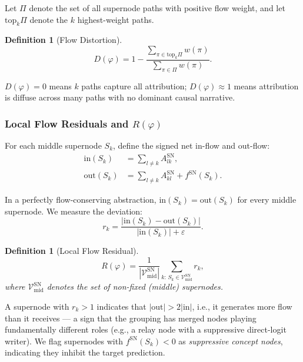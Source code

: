 \documentclass[11pt]{article}
\newtheorem{definition}[theorem]{Definition}
\newcommand{\cV}{\mathcal{V}}
\newcommand{\1}{\mathbbm{1}}
\newcommand{\eps}{\varepsilon}
\begin{document}
Let $\Pi$ denote the set of all supernode paths with positive flow weight, and let $\mathrm{top}_k \Pi$ denote the $k$ highest-weight paths.

\begin{definition}[Flow Distortion]
  \begin{equation}
    D(\varphi) = 1 - \frac{\sum_{\pi \in \mathrm{top}_k \Pi} w(\pi)}{\sum_{\pi \in \Pi} w(\pi)}.
    \label{eq:D-phi}
  \end{equation}
\end{definition}

$D(\varphi) = 0$ means $k$ paths capture all attribution; $D(\varphi) \approx 1$ means attribution is diffuse across many paths with no dominant causal narrative.

\subsubsection{Local Flow Residuals and $R(\varphi)$}
\label{sec:residuals}

For each middle supernode $S_k$, define the signed net in-flow and out-flow:
\begin{align}
  \mathrm{in}(S_k) &= \sum_{l \ne k} A^{\mathrm{SN}}_{lk}, \label{eq:inflow} \\
  \mathrm{out}(S_k) &= \sum_{l \ne k} A^{\mathrm{SN}}_{kl} + f^{\mathrm{SN}}(S_k). \label{eq:outflow}
\end{align}

In a perfectly flow-conserving abstraction, $\mathrm{in}(S_k) = \mathrm{out}(S_k)$ for every middle supernode.
We measure the deviation:
\[
  r_k = \frac{|\mathrm{in}(S_k) - \mathrm{out}(S_k)|}{|\mathrm{in}(S_k)| + \eps}.
\]

\begin{definition}[Local Flow Residual]
  \begin{equation}
    R(\varphi) = \frac{1}{|\cV_{\mathrm{mid}}^{\mathrm{SN}}|} \sum_{k:\, S_k \in \cV_{\mathrm{mid}}^{\mathrm{SN}}} r_k,
    \label{eq:R-phi}
  \end{equation}
  where $\cV_{\mathrm{mid}}^{\mathrm{SN}}$ denotes the set of non-fixed (middle) supernodes.
\end{definition}

A supernode with $r_k > 1$ indicates that $|\mathrm{out}| > 2|\mathrm{in}|$, i.e., it generates more flow than it receives --- a sign that the grouping has merged nodes playing fundamentally different roles (e.g., a relay node with a suppressive direct-logit writer).
We flag supernodes with $f^{\mathrm{SN}}(S_k) < 0$ as \emph{suppressive concept nodes}, indicating they inhibit the target prediction.
\end{document}
